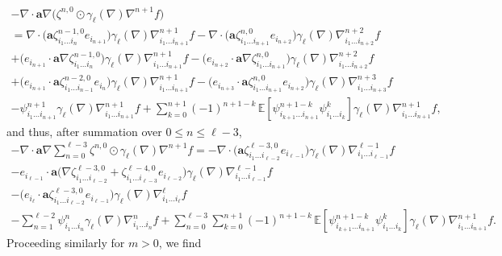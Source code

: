\documentclass[10pt]{amsart}
\theoremstyle{plain}
\theoremstyle{definition}
\numberwithin{equation}{section}
\newcommand{\ee}{e}
\newcommand{\Aa}{\boldsymbol a}
\newcommand{\expec}[1]{\mathbb{E}\left[ #1 \right]}
\begin{document}
\begin{multline*}
-\nabla\cdot\Aa\nabla\big(\zeta^{n,0} \odot \gamma_{\ell}(\nabla)\nabla^{n+1} f\big)\\
=\nabla\cdot\big(\Aa\zeta^{n-1,0}_{i_1\ldots i_n}\ee_{i_{n+1}}\big)\gamma_{\ell}(\nabla)\nabla^{n+1}_{i_1\ldots i_{n+1}} f
-\nabla\cdot\big(\Aa\zeta^{n,0}_{i_1\ldots i_{n+1}}\ee_{i_{n+2}}\big)\gamma_{\ell}(\nabla)\nabla^{n+2}_{i_1\ldots i_{n+2}} f\\
+\big(\ee_{i_{n+1}}\cdot\Aa\nabla\zeta^{n-1,0}_{i_1\ldots i_n}\big)\gamma_{\ell}(\nabla)\nabla^{n+1}_{i_1\ldots i_{n+1}} f
-\big(\ee_{i_{n+2}}\cdot\Aa\nabla\zeta^{n,0}_{i_1\ldots i_{n+1}}\big) \gamma_{\ell}(\nabla)\nabla^{n+2}_{i_1\ldots i_{n+2}} f\\
+\big(\ee_{i_{n+1}}\cdot\Aa\zeta^{n-2,0}_{i_1\ldots i_{n-1}}\ee_{i_n}\big)\gamma_{\ell}(\nabla)\nabla^{n+1}_{i_1\ldots i_{n+1}} f
-\big(\ee_{i_{n+3}}\cdot\Aa\zeta^{n,0}_{i_1\ldots i_{n+1}}\ee_{i_{n+2}}\big)\gamma_{\ell}(\nabla)\nabla^{n+3}_{i_1\ldots i_{n+3}} f\\
-\psi^{n+1}_{i_1\ldots i_{n+1}}\gamma_{\ell}(\nabla)\nabla^{n+1}_{i_1\ldots i_{n+1}} f
+\sum_{k=0}^{n+1}(-1)^{n+1-k}\,\expec{\psi^{n+1-k}_{i_{k+1}\ldots i_{n+1}}\psi^k_{i_{1}\ldots i_k}}\gamma_{\ell}(\nabla)\nabla^{n+1}_{i_1\ldots i_{n+1}} f,
\end{multline*}
and thus, after summation over $0\le n\le\ell-3$,\vspace*{-3pt}
\begin{multline*}
-\nabla\cdot\Aa\nabla\sum_{n=0}^{\ell-3}\zeta^{n,0} \odot \gamma_{\ell}(\nabla)\nabla^{n+1} f
=-\nabla\cdot\big(\Aa\zeta^{\ell-3,0}_{i_1\ldots i_{\ell-2}}\ee_{i_{\ell-1}}\big)\gamma_{\ell}(\nabla)\nabla^{\ell-1}_{i_1\ldots i_{\ell-1}} f\\
-\ee_{i_{\ell-1}}\cdot\Aa\big(\nabla\zeta^{\ell-3,0}_{i_1\ldots i_{\ell-2}}+\zeta^{\ell-4,0}_{i_1\ldots i_{\ell-3}}\ee_{i_{\ell-2}}\big)\gamma_{\ell}(\nabla)\nabla^{\ell-1}_{i_1\ldots i_{\ell-1}} f\\
-\big(\ee_{i_{\ell}}\cdot\Aa\zeta^{\ell-3,0}_{i_1\ldots i_{\ell-2}}\ee_{i_{\ell-1}}\big)\gamma_{\ell}(\nabla)\nabla^{\ell}_{i_1\ldots i_{\ell}} f\\
-\sum_{n=1}^{\ell-2}\psi^{n}_{i_1\ldots i_{n}}\gamma_{\ell}(\nabla)\nabla^{n}_{i_1\ldots i_{n}} f
+\sum_{n=0}^{\ell-3}\sum_{k=0}^{n+1}(-1)^{n+1-k}\,\expec{\psi^{n+1-k}_{i_{k+1}\ldots i_{n+1}}\psi^k_{i_{1}\ldots i_k}}\gamma_{\ell}(\nabla)\nabla^{n+1}_{i_1\ldots i_{n+1}} f.
\end{multline*}
Proceeding similarly for $m>0$, we find\vspace*{-3pt}\enlargethispage{-2\baselineskip}
\end{document}
